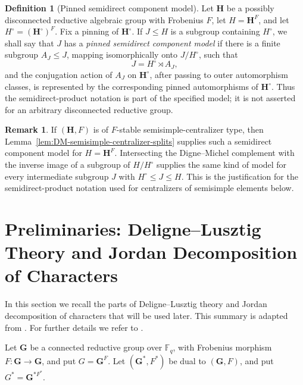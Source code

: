 \documentclass{amsart}
\theoremstyle{plain}
\numberwithin{equation}{section}
\theoremstyle{definition}
\newtheorem{definition}[theorem]{Definition}
\newtheorem{remark}[theorem]{Remark}
\newcommand{\fq}{\mathbb{F}_{q}}
\newcommand{\bG}{\mathbf{G}}
\begin{document}
\begin{definition}[Pinned semidirect component model]
\label{def:pinned-semidirect-component-model}
Let \(\mathbf H\) be a possibly disconnected reductive algebraic group with
Frobenius \(F\), let \(H=\mathbf H^F\), and let \(H^\circ=(\mathbf H^\circ)^F\).
Fix a pinning of \(\mathbf H^\circ\).  If \(J\le H\) is a subgroup containing
\(H^\circ\), we shall say that \(J\) has a \emph{pinned semidirect component
model} if there is a finite subgroup \(A_J\le J\), mapping isomorphically onto
\(J/H^\circ\), such that
\[
        J=H^\circ\rtimes A_J,
\]
and the conjugation action of \(A_J\) on \(\mathbf H^\circ\), after passing to
outer automorphism classes, is represented by the corresponding pinned
automorphisms of \(\mathbf H^\circ\).  Thus the semidirect-product notation is
part of the specified model; it is not asserted for an arbitrary disconnected
reductive group.
\end{definition}

\begin{remark}
\label{rmk:DM-supplies-pinned-component-models}
If \((\mathbf H,F)\) is of \(F\)-stable semisimple-centralizer type, then
Lemma~\ref{lem:DM-semisimple-centralizer-splits} supplies such a semidirect
component model for \(H=\mathbf H^F\).  Intersecting the Digne--Michel
complement with the inverse image of a subgroup of \(H/H^\circ\) supplies the
same kind of model for every intermediate subgroup \(J\) with
\(H^\circ\le J\le H\).  This is the justification for the semidirect-product
notation used for centralizers of semisimple elements below.
\end{remark}

\section{Preliminaries: Deligne--Lusztig Theory and Jordan Decomposition of Characters}
\label{sec:DL-theory-JD}

In this section we recall the parts of Deligne--Lusztig theory and Jordan
decomposition of characters that will be used later.  This summary is adapted
from \cite[]{AroteMishra22b}.  For further details we refer to
\cite{DelLus76,Lus84,Lus88,Book:DigneandMichel,Book:GeckandMalle}.

Let \(\bG\) be a connected reductive group over \(\fq\), with Frobenius
morphism \(F:\bG\to \bG\), and put \(G=\bG^F\).  Let
\((\bG^*,F^*)\) be dual to \((\bG,F)\), and put
\(G^*=\bG^{*F^*}\).
\end{document}
